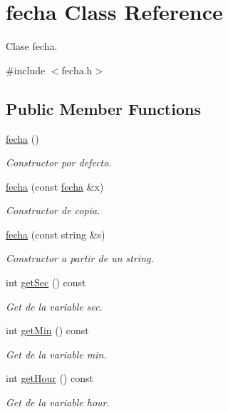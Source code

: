 \hypertarget{classfecha}{\section{fecha Class Reference}
\label{classfecha}
}


Clase fecha.  




{\ttfamily \#include $<$fecha.\-h$>$}

\subsection*{Public Member Functions}
\begin{DoxyCompactItemize}
\item 
\hyperlink{classfecha_a6775ef84b5838e12e28fd341793f4539}{fecha} ()
\begin{DoxyCompactList}\small\item\em Constructor por defecto. \end{DoxyCompactList}\item 
\hyperlink{classfecha_aa1eba8664082c8e8cd8c30c0b02ca3b9}{fecha} (const \hyperlink{classfecha}{fecha} \&x)
\begin{DoxyCompactList}\small\item\em Constructor de copia. \end{DoxyCompactList}\item 
\hyperlink{classfecha_aed5c22d5eeb15f1f2927d5a2c28b74df}{fecha} (const string \&s)
\begin{DoxyCompactList}\small\item\em Constructor a partir de un string. \end{DoxyCompactList}\item 
int \hyperlink{classfecha_aa4673cd015852eb1ba4c2178414a9993}{get\-Sec} () const 
\begin{DoxyCompactList}\small\item\em Get de la variable sec. \end{DoxyCompactList}\item 
int \hyperlink{classfecha_af5b48a2a80c7d1b304c2d3c073ffeecb}{get\-Min} () const 
\begin{DoxyCompactList}\small\item\em Get de la variable min. \end{DoxyCompactList}\item 
int \hyperlink{classfecha_a974311ce9fc8ada1c2b2a9594476eed3}{get\-Hour} () const 
\begin{DoxyCompactList}\small\item\em Get de la variable hour. \end{DoxyCompactList}\item 

\end{DoxyCompactItemize}
